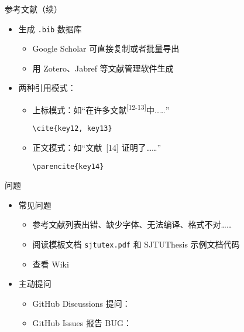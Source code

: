 \begin{frame}[fragile]{参考文献（续）}
  \begin{itemize}
    \item 生成 \verb|.bib| 数据库
          \begin{itemize}
            \item Google Scholar 可直接复制或者批量导出
            \item 用 Zotero、Jabref 等文献管理软件生成
          \end{itemize}
    \item 两种引用模式：
          \begin{itemize}
            \item 上标模式：如“在许多文献\textsuperscript{[12-13]}中……”
                  \begin{lstlisting}[basicstyle=\ttfamily]
    \cite{key12, key13}
          \end{lstlisting}
            \item 正文模式：如“文献~[14] 证明了……”
                  \begin{lstlisting}[basicstyle=\ttfamily,morekeywords={parencite}]
    \parencite{key14}
          \end{lstlisting}
          \end{itemize}
  \end{itemize}
\end{frame}

\begin{frame}[fragile]{\SJTUThesis 问题}
  \begin{itemize}
    \item 常见问题
          \begin{itemize}
            \item 参考文献列表出错、缺少字体、无法编译、格式不对……
            \item 阅读模板文档 \verb|sjtutex.pdf| 
                  和 SJTUThesis 示例文档代码
            \item 查看 Wiki 
          \end{itemize}

    \item 主动提问
          \begin{itemize}
            \item GitHub Discussions 提问：
            \item GitHub Issues 报告 BUG：
          \end{itemize}

  \end{itemize}
\end{frame}
